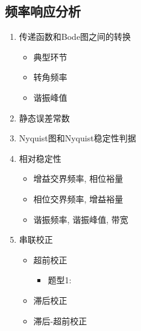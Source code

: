 \subsection{频率响应分析}
\begin{enumerate}
    \item 传递函数和Bode图之间的转换
    \begin{itemize}
        \item 典型环节
        \item 转角频率
        \item 谐振峰值
    \end{itemize}
    \item 静态误差常数
    \item Nyquist图和Nyquist稳定性判据
    \item 相对稳定性
    \begin{itemize}
        \item 增益交界频率, 相位裕量
        \item 相位交界频率, 增益裕量
        \item 谐振频率, 谐振峰值, 带宽
    \end{itemize}
    \item 串联校正
    \begin{itemize}
        \item 超前校正
        \begin{itemize}
            \item 题型1: 
        \end{itemize}
        \item 滞后校正
        \item 滞后-超前校正
    \end{itemize}
\end{enumerate}